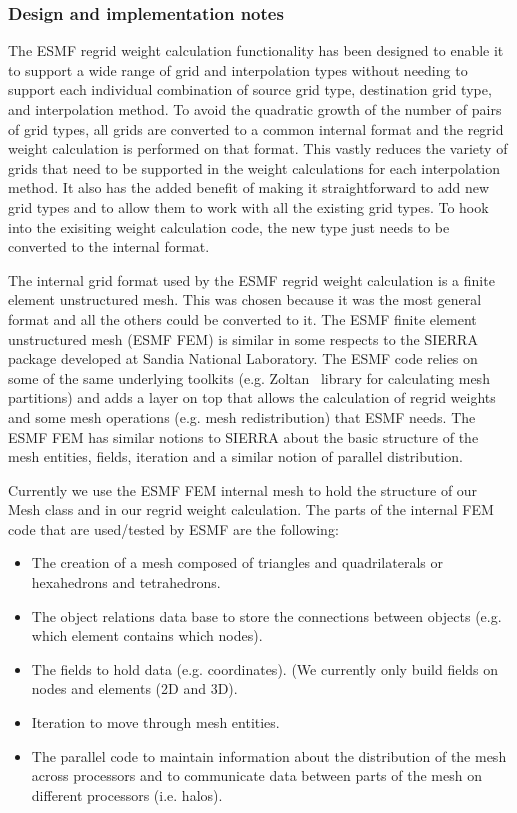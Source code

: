 \subsubsection{Design and implementation notes}

The ESMF regrid weight calculation functionality has been designed to enable it to support a wide range
of grid and interpolation types without needing to support each individual combination of source grid type,
destination grid type, and interpolation method. To avoid the quadratic growth of the number of pairs
of grid types, all grids are converted to a common internal format and the regrid weight calculation
is performed on that format. This vastly reduces the variety of grids that need to be supported in 
the weight calculations for each interpolation method. It also has the added benefit of making it
straightforward to add new grid types and to allow them to work with all the existing grid types.
To hook into the exisiting weight calculation code, the new type just needs to be converted to the
internal format. 

The internal grid format used by the ESMF regrid weight calculation is a finite element
unstructured mesh. This was chosen because it was the most general format and all the others could be 
converted to it. The ESMF finite element unstructured mesh (ESMF FEM) is similar in some respects to the SIERRA~\cite{Sierra} package 
developed at Sandia National Laboratory. The ESMF code relies on some of the same underlying toolkits (e.g. Zoltan~\cite{Zoltan} library 
for calculating mesh partitions) and adds a layer on top that allows the calculation of regrid weights and some mesh operations 
(e.g. mesh redistribution) that ESMF needs. The ESMF FEM has similar notions to SIERRA about the basic structure of the
mesh entities, fields, iteration and a similar notion of parallel distribution. 

Currently we use the ESMF FEM internal mesh to hold the structure of our Mesh class and 
in our regrid weight calculation. The parts of the internal FEM code that are used/tested by ESMF are the following:
\begin{itemize}
\item The creation of a mesh composed of triangles and quadrilaterals or hexahedrons and tetrahedrons.
\item The object relations data base to store the connections between objects (e.g. which element contains which nodes).
\item The fields to hold data (e.g. coordinates). (We currently only build fields on nodes and elements (2D and 3D).
\item Iteration to move through mesh entities.
\item The parallel code to maintain information about the distribution of the mesh across processors and to communicate data between parts of the mesh on different processors (i.e. halos).
\end{itemize}



